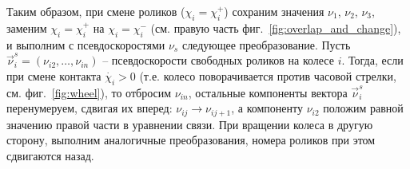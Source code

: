 Таким образом, при смене роликов ($\chi_i = \chi_i^+$) сохраним значения $\nu_1$, $\nu_2$, $\nu_3$, заменим $\chi_i = \chi_i^+$ на $\chi_i = \chi_i^-$ (см. правую часть фиг.~\ref{fig:overlap_and_change}), и выполним с псевдоскоростями $\nu_s$ следующее преобразование. Пусть $\vec{\nu}_i^s = (\nu_{i2},\ldots,\nu_{in})$ -- псевдоскорости свободных роликов на колесе $i$. Тогда, если при смене контакта $\dot{\chi_i} > 0$ (т.е. колесо поворачивается против часовой стрелки, см. фиг.~\ref{fig:wheel}), то отбросим $\nu_{in}$, остальные компоненты вектора $\vec{\nu}_i^s$ перенумеруем, сдвигая их вперед: $\nu_{ij} \rightarrow \nu_{ij+1}$, а компоненту $\nu_{i2}$ положим равной значению правой части в уравнении связи. При вращении колеса в другую сторону, выполним аналогичные преобразования, номера роликов при этом сдвигаются назад.
